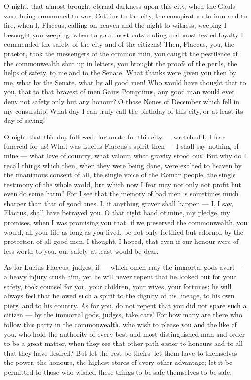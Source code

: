  O night, that almost brought eternal darkness upon this city, when the Gauls were being summoned to war, Catiline to the city, the conspirators to iron and to fire, when I, Flaccus, calling on heaven and the night to witness, weeping I besought you weeping, when to your most outstanding and most tested loyalty I commended the safety of the city and of the citizens! Then, Flaccus, you, the praetor, took the messengers of the common ruin, you caught the pestilence of the commonwealth shut up in letters, you brought the proofs of the perils, the helps of safety, to me and to the Senate. What thanks were given you then by me, what by the Senate, what by all good men! Who would have thought that to you, that to that bravest of men Gaius Pomptinus, any good man would ever deny not safety only but any honour? O those Nones of December which fell in my consulship! What day I can truly call the birthday of this city, or at least its day of saving!

 O night that this day followed, fortunate for this city --- wretched I, I fear funereal for us! What was Lucius Flaccus's spirit then --- I shall say nothing of mine --- what love of country, what valour, what gravity stood out! But why do I recall things which then, when they were being done, were exalted to heaven by the unanimous consent of all, the single voice of the Roman people, the single testimony of the whole world, but which now I fear may not only not profit but even do some harm? For I see that the memory of bad men is sometimes much sharper than that of good ones. I, if anything graver shall happen --- I, I say, Flaccus, shall have betrayed you. O that right hand of mine, my pledge, my promises, when I was promising you that, if we preserved the commonwealth, you would, all your life as long as you lived, be not only fortified but adorned by the protection of all good men. I thought, I hoped, that even if our honour were of less worth to you, our safety at least would be dear.

 As for Lucius Flaccus, judges, if --- which omen may the immortal gods avert --- a heavy injury crush him, yet he will never repent that he looked out for your safety, took counsel for you, your children, your wives, your fortunes; he will always feel that he owed such a spirit to the dignity of his lineage, to his own piety, and to his country. As for you, do not repent that you did not spare such a citizen --- by the immortal gods, judges, take care! For how many are there who follow this party in the commonwealth, who wish to please you and the like of you, who hold the authority of every best and most distinguished man and order to be a great matter, when they see that other path easier to honours and to all that they have desired? But let the rest be theirs; let them have to themselves the power, the honours, the highest stores of every other advantage; let it be permitted to those who wished these things to be safe themselves to be safe.

